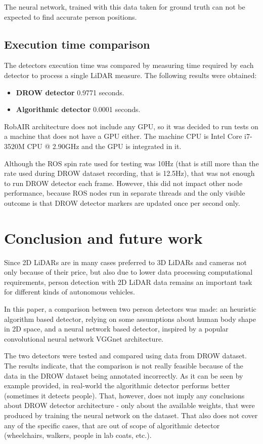 \documentclass{article}
\begin{document}
The neural network, trained with this data taken for ground truth can not be expected to find accurate person positions.

\subsection{Execution time comparison}

The detectors execution time was compared by measuring time required by each detector to process a single LiDAR measure.
The following results were obtained:

\begin{itemize}
	\item \textbf{DROW detector} 0.9771 seconds.
	\item \textbf{Algorithmic detector} 0.0001 seconds.
\end{itemize}

RobAIR architecture does not include any GPU, so it was decided to run tests on a machine that does not have a GPU either.
The machine CPU is Intel\textregistered{} Core\texttrademark{} i7-3520M CPU @ 2.90GHz and the GPU is integrated in it.

Although the ROS spin rate used for testing was 10Hz (that is still more than the rate used during DROW dataset recording, that is 12.5Hz), that was not enough to run DROW detector each frame.
However, this did not impact other node performance, because ROS nodes run in separate threads and the only visible outcome is that DROW detector markers are updated once per second only.

\section{Conclusion and future work}

Since 2D LiDARs are in many cases preferred to 3D LiDARs and cameras not only because of their price, but also due to lower data processing computational requirements\cite{2D_3D_lidars}, person detection with 2D LiDAR data remains an important task for different kinds of autonomous vehicles.

In this paper, a comparison between two person detectors was made: an heuristic algorithm based detector, relying on some assumptions about human body shape in 2D space, and a neural network based detector, inspired by a popular convolutional neural network VGGnet\cite{vggnet_paper} architecture. 

The two detectors were tested and compared using data from DROW dataset.
The results indicate, that the comparison is not really feasible because of the data in the DROW dataset being annotated incorrectly.
As it can be seen by example provided, in real-world the algorithmic detector performs better (sometimes it detects people).
That, however, does not imply any conclusions about DROW detector architecture - only about the available weights, that were produced by training the neural network on the dataset.
That also does not cover any of the specific cases, that are out of scope of algorithmic detector (wheelchairs, walkers, people in lab coats, etc.).
\end{document}
